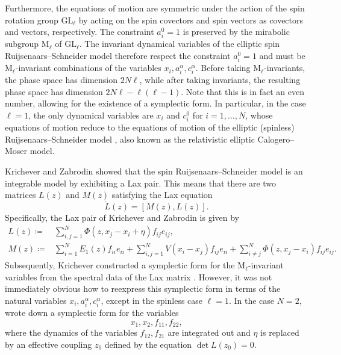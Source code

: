 Furthermore, the equations of motion are symmetric under the action of the spin rotation group $\mathrm{GL}_\ell$ by acting on the spin covectors and spin vectors as covectors and vectors, respectively. The constraint $a_i^0 = 1$ is preserved by the mirabolic subgroup $\mathrm{M}_\ell$ of $\mathrm{GL}_\ell$. The invariant dynamical variables of the elliptic spin Ruijsenaars--Schneider model therefore respect the constraint $a_i^0 = 1$ and must be $\mathrm{M}_\ell$-invariant combinations of the variables $x_i,a_i^\alpha,c_i^\alpha$. Before taking $\mathrm{M}_\ell$-invariants, the phase space has dimension $2N\ell$, while after taking invariants, the resulting phase space has dimension $2N\ell - \ell(\ell-1)$. Note that this is in fact an even number, allowing for the existence of a symplectic form. In particular, in the case $\ell = 1$, the only dynamical variables are $x_i$ and $c_i^0$ for $i=1,\dots,N$, whose equations of motion reduce to the equations of motion of the elliptic (spinless) Ruijsenaars--Schneider model \cite{ruijsenaars_complete_1987}, also known as the relativistic elliptic Calogero--Moser model.

Krichever and Zabrodin showed that the spin Ruijsenaars--Schneider model is an integrable model by exhibiting a Lax pair. This means that there are two matrices $L(z)$ and $M(z)$ satisfying the Lax equation
\begin{equation}
	\dot L(z) = [M(z),L(z)].
\end{equation}
Specifically, the Lax pair of Krichever and Zabrodin is given by
\begin{equation}
    \begin{aligned}
		L(z) \coloneq{}& \sum_{i,j=1}^N \Phi(z,x_j-x_i+\eta) f_{ij} e_{ij}, \qquad \\
        M(z) \coloneq{}& \sum_{i=1}^N E_1(z) f_{ii} e_{ii} + \sum_{i,j=1}^N V(x_i-x_j) f_{ij} e_{ii} + \sum_{i \neq j}^N \Phi(z,x_j-x_i) f_{ij} e_{ij}.
    \end{aligned}
\end{equation}
Subsequently, Krichever constructed a symplectic form for the $\mathrm{M}_\ell$-invariant variables from the spectral data of the Lax matrix \cite{krichever_elliptic_1998}. However, it was not immediately obvious how to reexpress this symplectic form in terms of the natural variables $x_i,a_i^\alpha,c_i^\alpha$, except in the spinless case $\ell=1$. In the case $N=2$, \cite{soloviev_hamiltonian_2008} wrote down a symplectic form for the variables
\begin{equation}
	x_1, x_2, f_{11}, f_{22},
\end{equation}
where the dynamics of the variables $f_{12},f_{21}$ are integrated out and $\eta$ is replaced by an effective coupling $z_0$ defined by the equation $\det L(z_0) = 0$.

